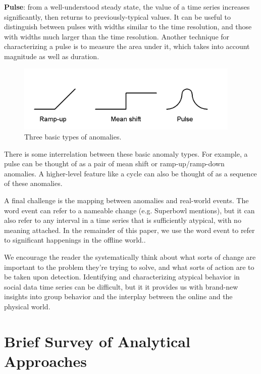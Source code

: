 \documentclass{article}
\begin{document}
\textbf{Pulse}: from a well-understood steady state, the value of a time series
increases significantly, then returns to previously-typical values. It can be
useful to distinguish between pulses with widths similar to the time
resolution, and those with widths much larger than the time resolution. Another
technique for characterizing a pulse is to measure the area under it, which
takes into account magnitude as well as duration. 

\begin{figure}
\begin{center}
\includegraphics[width=0.95\textwidth]{fig/anomalies.png}
\caption{Three basic types of anomalies.}
\label{fig:anomalies}
\end{center}
\end{figure}

There is some interrelation between these basic anomaly types. For example, a
pulse can be thought of as a pair of mean shift or ramp-up/ramp-down anomalies.
A higher-level feature like a cycle can also be thought of as a sequence of
these anomalies. 
    
A final challenge is the mapping between anomalies and real-world events. The
word event can refer to a nameable change (e.g. Superbowl mentions), but it can
also refer to any interval in a time series that is sufficiently atypical, with
no meaning attached. In the remainder of this paper, we use the word event to
refer to significant happenings in the offline world.. 

We encourage the reader the systematically think about what sorts of change
are important to the problem they’re trying to solve, and what sorts of
action are to be taken upon detection. Identifying and characterizing
atypical behavior in social data time series can be difficult, but it it
provides us with brand-new insights into group behavior and the interplay
between the online and the physical world.  


\section{Brief Survey of Analytical Approaches}
\label{techniques}
\end{document}
